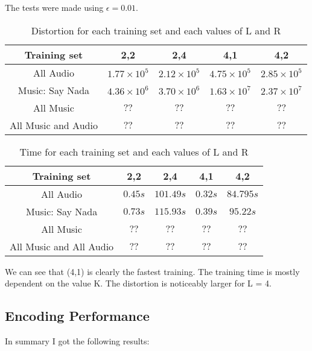 \documentclass[a4paper, 11pt]{article}
\begin{document}
			The tests were made using $ \epsilon = 0.01 $.
			\begin{table}[H]
				\centering
				\begin{tabular}{c|c|c|c|c}
					\textbf{Training set} & \textbf{2,2} 			& \textbf{2,4}			&  \textbf{4,1}				& \textbf{4,2} \\ \hline
					All Audio 			& $ 1.77 \times 10^{5} $ 	& $ 2.12 \times 10^{5} $& $4.75 \times 10^{5} $ 	& $ 2.85 \times 10^{5} $ \\ \hline
					Music: Say Nada		& $ 4.36 \times 10^{6} $ 	& $ 3.70 \times 10^{6} $& $ 1.63 \times 10^{7} $  	& $ 2.37 \times 10^{7} $ \\ \hline	
					All Music 			& $ ?? $					& $	?? $				& $ ?? $					& $	?? $ \\ \hline
					All Music and Audio & $ ?? $					& $	?? $				& $ ?? $					& $	?? $ \\
				\end{tabular}
				\caption{Distortion for each training set and each values of L and R}
				\label{table:TrainDist}
			\end{table}
			
			\begin{table}[H]
				\centering
				\begin{tabular}{c|c|c|c|c}
					\textbf{Training set}	 	& \textbf{2,2} & \textbf{2,4}	& \textbf{4,1} & \textbf{4,2}\\ \hline
					All Audio 					& $ 0.45 s $ 	& $ 101.49 s $	& $ 0.32 s $ 	& $ 84.79 5 s $	\\ \hline
					Music: Say Nada				& $ 0.73 s $	& $ 115.93 s $	& $ 0.39 s $ 	& $ 95.22 s $	\\ \hline	
					All Music					& $ ?? $		& $	?? $		& $ ?? $		& $	?? $		\\ \hline
					All Music and All Audio 	& $ ?? $		& $	?? $		& $ ?? $		& $	?? $		\\
				\end{tabular}
				\caption{Time for each training set and each values of L and R}
				\label{table:TrainTime}
			\end{table}
		
			We can see that (4,1) is clearly the fastest training.
			The training time is mostly dependent on the value K.
			The distortion is noticeably larger for L = 4.
			
		\subsection{Encoding Performance}
			In summary I got the following results:
			
\end{document}
